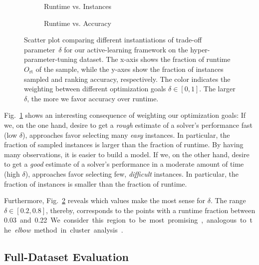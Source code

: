 \documentclass[runningheads]{llncs}
\begin{document}
\begin{figure}[tb!]
  \centering
  \begin{subfigure}{0.4775\textwidth}
    \caption{Runtime vs. Instances}
    \label{fig:annitrainoptgoalruntime}
  \end{subfigure}
  \begin{subfigure}{0.5125\textwidth}
    \caption{Runtime vs. Accuracy}
    \label{fig:annitrainoptgoalacc}
  \end{subfigure}

  \caption{
    Scatter plot comparing different instantiations of trade-off parameter~$\delta$ for our active-learning framework on the hyper-parameter-tuning dataset.
    The x-axis shows the fraction of runtime $O_{\operatorname{rt}}$ of the sample, while the y-axes show the fraction of instances sampled and ranking accuracy, respectively.
    The color indicates the weighting between different optimization goals $\delta \in \left[0, 1\right]$.
    The larger $\delta$, the more we favor accuracy over runtime.
  }
  \label{fig:annitrainoptgoal}
\end{figure}

Fig.~\ref{fig:annitrainoptgoalruntime} shows an interesting consequence of weighting our optimization goals:
If we, on the one hand, desire to get a \emph{rough} estimate of a solver's performance fast (low $\delta$), approaches favor selecting many \emph{easy} instances.
In particular, the fraction of sampled instances is larger than the fraction of runtime.
By having many observations, it is easier to build a model.
If we, on the other hand, desire to get a \emph{good} estimate of a solver's performance in a moderate amount of time (high $\delta$), approaches favor selecting few, \emph{difficult} instances.
In particular, the fraction of instances is smaller than the fraction of runtime.

Furthermore, Fig.~\ref{fig:annitrainoptgoalacc} reveals which values make the most sense for $\delta$.
The range $\delta \in \left[0.2, 0.8\right]$, thereby, corresponds to the points with a runtime fraction between \SI{0.03} and \SI{0.22}.
We consider this region to be most promising, analogous to the \emph{elbow} method in cluster analysis~\cite{kodinariya2013review}.

\subsection{Full-Dataset Evaluation}
\end{document}
